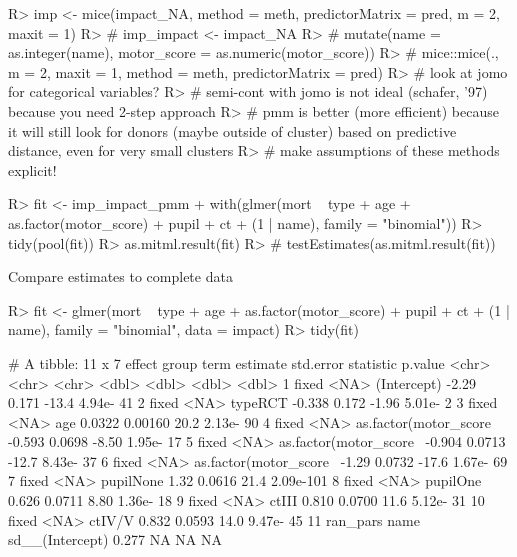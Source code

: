 \documentclass[
]{jss}
\begin{document}
\begin{CodeChunk}
\begin{CodeInput}
R> imp <- mice(impact_NA, method = meth, predictorMatrix = pred, m = 2, maxit = 1)
R> # imp_impact <- impact_NA %
R> #   mutate(name = as.integer(name), motor_score = as.numeric(motor_score)) %
R> #   mice::mice(., m = 2, maxit = 1, method = meth, predictorMatrix = pred)
R> # look at jomo for categorical variables?
R> # semi-cont with jomo is not ideal (schafer, '97) because you need 2-step approach
R> # pmm is better (more efficient) because it will still look for donors (maybe outside of cluster) based on predictive distance, even for very small clusters
R> # make assumptions of these methods explicit!
\end{CodeInput}
\end{CodeChunk}

\begin{CodeChunk}
\begin{CodeInput}
R> fit <- imp_impact_pmm %
+   with(glmer(mort ~ type + age + as.factor(motor_score) + pupil + ct + (1 | name), family = "binomial")) 
R> tidy(pool(fit))
R> as.mitml.result(fit)
R> # testEstimates(as.mitml.result(fit))
\end{CodeInput}
\end{CodeChunk}

Compare estimates to complete data

\begin{CodeChunk}
\begin{CodeInput}
R> fit <- glmer(mort ~ type + age + as.factor(motor_score) + pupil + ct + (1 | name), family = "binomial", data = impact) 
R> tidy(fit)
\end{CodeInput}
\begin{CodeOutput}
# A tibble: 11 x 7
   effect   group term                   estimate std.error statistic    p.value
   <chr>    <chr> <chr>                     <dbl>     <dbl>     <dbl>      <dbl>
 1 fixed    <NA>  (Intercept)             -2.29     0.171      -13.4   4.94e- 41
 2 fixed    <NA>  typeRCT                 -0.338    0.172       -1.96  5.01e-  2
 3 fixed    <NA>  age                      0.0322   0.00160     20.2   2.13e- 90
 4 fixed    <NA>  as.factor(motor_score~  -0.593    0.0698      -8.50  1.95e- 17
 5 fixed    <NA>  as.factor(motor_score~  -0.904    0.0713     -12.7   8.43e- 37
 6 fixed    <NA>  as.factor(motor_score~  -1.29     0.0732     -17.6   1.67e- 69
 7 fixed    <NA>  pupilNone                1.32     0.0616      21.4   2.09e-101
 8 fixed    <NA>  pupilOne                 0.626    0.0711       8.80  1.36e- 18
 9 fixed    <NA>  ctIII                    0.810    0.0700      11.6   5.12e- 31
10 fixed    <NA>  ctIV/V                   0.832    0.0593      14.0   9.47e- 45
11 ran_pars name  sd__(Intercept)          0.277   NA           NA    NA        
\end{CodeOutput}
\end{CodeChunk}
\end{document}
